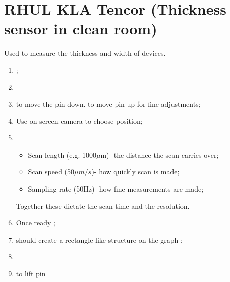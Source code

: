\section{RHUL KLA Tencor (Thickness sensor in clean room)}
  Used to measure the thickness and width of devices.
  
  \begin{enumerate}
  	\item {};
  	\item {}
  	\item {} to move the pin down.  to move pin up for fine adjustments;
  	\item {} Use on screen camera to choose position;
  	\item {}
  	\begin{itemize}
  		\item Scan length (e.g. 1000$ \mu $m)- the distance the scan carries over;
  		\item Scan speed (50$ \mu m /s$)- how quickly scan is made;
  		\item Sampling rate (50Hz)- how fine measurements are made;
  	\end{itemize}
  	Together these dictate the scan time and the resolution. 

	\item Once ready  ;
	\item {} should create a rectangle like structure on the graph \ira {};
	\item {}
	\item {} to lift pin \ira {}
   \end{enumerate}
 \newpage
 